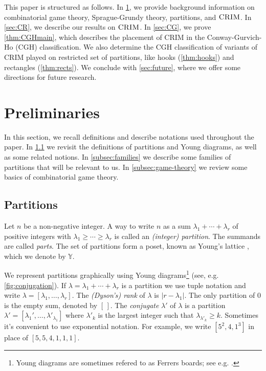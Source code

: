 \documentclass[pdflatex,sn-mathphys-num]{sn-jnl}%
\theoremstyle{thmstyleone}%
\theoremstyle{thmstyletwo}%
\theoremstyle{thmstylethree}%
\newcommand{\crim}{\textsc{CRIM} \/}
\newcommand{\y}{\mathbb{Y}}
\begin{document}
This paper is structured as follows. 
In \cref{sec:prelims}, we provide background information on combinatorial game theory, Sprague-Grundy theory, partitions, and $\crim$. 
In \cref{sec:CR}, we describe our results on $\crim$. 
In \cref{sec:CG}, we prove \cref{thm:CGHmain}, which describes the placement of \crim in the Conway-Gurvich-Ho (CGH) classification. 
We also determine the CGH classification of variants of CRIM played on restricted set of partitions, like hooks (\cref{thm:hooks}) and rectangles (\cref{thm:rects}). 
We conclude with \cref{sec:future}, where we offer some directions for future research. 

\section{Preliminaries} \label{sec:prelims}


In this section, we recall definitions and describe notations used throughout the paper. In \cref{subsec:pttns} we revisit the definitions of partitions and Young diagrams, as well as some related notions. In \cref{subsec:families} we describe some families of partitions that will be relevant to us. In \cref{subsec:game-theory} we review some basics of combinatorial game theory. 

\subsection{Partitions} \label{subsec:pttns}
Let $n$ be a non-negative integer. A way to write $n$ as a sum $\lambda_1 + \cdots + \lambda_r$ of positive integers with $\lambda_1 \geq \cdots \geq \lambda_r$ is called an \emph{(integer) partition}. The summands are called \emph{parts}. The set of partitions form a poset, known as Young's lattice \cite{Stanley}, which we denote by $\y$. 

We represent partitions graphically using Young diagrams\footnote{Young diagrams are sometimes refered to as Ferrers boards; see e.g. \cite{zbMATH06870132,zbMATH07369446}.} (see, e.g. \cref{fig:conjugation}).
If $\lambda = \lambda_1 + \cdots + \lambda_r$ is a partition we use tuple notation and write $\lambda = [\lambda_1, \ldots, \lambda_r]$. 
The \emph{(Dyson's) rank} of $\lambda$ is $|r - \lambda_1|$. 
The only partition of $0$ is the empty sum, denoted by $[ \, ]$. 
The \emph{conjugate} $\lambda'$ of $\lambda$ is a partition $\lambda' = [\lambda_1', \ldots, \lambda'_{\lambda_1}]$ where $\lambda'_k$ is the largest integer such that $\lambda_{\lambda'_k} \geq k$. 
Sometimes it's convenient to use exponential notation. 
For example, we write $[5^2, 4, 1^3]$ in place of $[5,5,4,1,1,1]$. 
\end{document}
